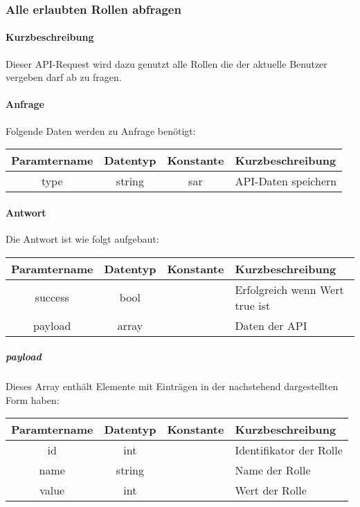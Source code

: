 \subsubsection{Alle erlaubten Rollen abfragen}
\paragraph{Kurzbeschreibung}Dieser API-Request wird dazu genutzt alle Rollen die der aktuelle Benutzer vergeben darf ab zu fragen.
\paragraph{Anfrage}Folgende Daten werden zu Anfrage benötigt:
\begin{table}[H]
	\begin{tabular}{|c|c|c|p{6.5cm}|}
		\hline
		\textbf{Paramtername} & \textbf{Datentyp} & \textbf{Konstante} & \textbf{Kurzbeschreibung}                                                                                               \\ \hline
		type                & string            & sar                & API-Daten speichern \\ \hline
	\end{tabular}
\end{table}
\paragraph{Antwort}Die Antwort ist wie folgt aufgebaut:
\begin{table}[H]
	\begin{tabular}{|c|c|c|p{6.5cm}|}
		\hline
		\textbf{Paramtername} & \textbf{Datentyp} & \textbf{Konstante} & \textbf{Kurzbeschreibung}            \\ \hline                
		success             & bool             &                 & Erfolgreich wenn Wert {\glqq true\grqq} ist \\ \hline
		payload             & array            &                 & Daten der API \\ \hline
	\end{tabular}
\end{table}
\subparagraph{payload}Dieses Array enthält Elemente mit Einträgen in der nachstehend dargestellten Form haben:
\begin{table}[H]
	\begin{tabular}{|c|c|c|p{6.5cm}|}
		\hline
		\textbf{Paramtername} & \textbf{Datentyp} & \textbf{Konstante} & \textbf{Kurzbeschreibung}    \\ \hline
		id                      & int               &                 & Identifikator der Rolle \\ \hline
		name                    & string            &                 & Name der Rolle \\ \hline
		value                   & int               &                 & Wert der Rolle \\ \hline
	\end{tabular}
\end{table}
